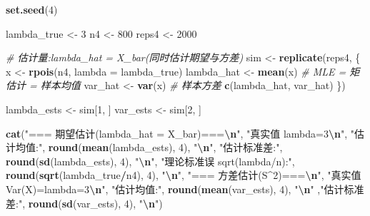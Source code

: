 \documentclass[
]{article}
\newenvironment{Shaded}{\begin{snugshade}}{\end{snugshade}}
\newcommand{\AttributeTok}[1]{\textcolor[rgb]{0.13,0.29,0.53}{#1}}
\newcommand{\CommentTok}[1]{\textcolor[rgb]{0.56,0.35,0.01}{\textit{#1}}}
\newcommand{\DecValTok}[1]{\textcolor[rgb]{0.00,0.00,0.81}{#1}}
\newcommand{\FunctionTok}[1]{\textcolor[rgb]{0.13,0.29,0.53}{\textbf{#1}}}
\newcommand{\NormalTok}[1]{#1}
\newcommand{\OtherTok}[1]{\textcolor[rgb]{0.56,0.35,0.01}{#1}}
\newcommand{\SpecialCharTok}[1]{\textcolor[rgb]{0.81,0.36,0.00}{\textbf{#1}}}
\newcommand{\StringTok}[1]{\textcolor[rgb]{0.31,0.60,0.02}{#1}}
\begin{document}
\begin{Shaded}
\begin{Highlighting}[]
\FunctionTok{set.seed}\NormalTok{(}\DecValTok{4}\NormalTok{)}

\NormalTok{lambda\_true }\OtherTok{\textless{}{-}} \DecValTok{3}
\NormalTok{n4          }\OtherTok{\textless{}{-}} \DecValTok{800}
\NormalTok{reps4       }\OtherTok{\textless{}{-}} \DecValTok{2000}

\CommentTok{\# 估计量:lambda\_hat = X\_bar(同时估计期望与方差)}
\NormalTok{sim }\OtherTok{\textless{}{-}} \FunctionTok{replicate}\NormalTok{(reps4, \{}
\NormalTok{  x      }\OtherTok{\textless{}{-}} \FunctionTok{rpois}\NormalTok{(n4, }\AttributeTok{lambda =}\NormalTok{ lambda\_true)}
\NormalTok{  lambda\_hat }\OtherTok{\textless{}{-}} \FunctionTok{mean}\NormalTok{(x)      }\CommentTok{\# MLE = 矩估计 = 样本均值}
\NormalTok{  var\_hat    }\OtherTok{\textless{}{-}} \FunctionTok{var}\NormalTok{(x)       }\CommentTok{\# 样本方差}
  \FunctionTok{c}\NormalTok{(lambda\_hat, var\_hat)}
\NormalTok{\})}

\NormalTok{lambda\_ests }\OtherTok{\textless{}{-}}\NormalTok{ sim[}\DecValTok{1}\NormalTok{, ]}
\NormalTok{var\_ests    }\OtherTok{\textless{}{-}}\NormalTok{ sim[}\DecValTok{2}\NormalTok{, ]}

\FunctionTok{cat}\NormalTok{(}\StringTok{"=== 期望估计(lambda\_hat = X\_bar)===}\SpecialCharTok{\textbackslash{}n}\StringTok{"}\NormalTok{,}
\StringTok{"真实值 lambda=3}\SpecialCharTok{\textbackslash{}n}\StringTok{"}\NormalTok{,}
\StringTok{"估计均值:"}\NormalTok{, }\FunctionTok{round}\NormalTok{(}\FunctionTok{mean}\NormalTok{(lambda\_ests), }\DecValTok{4}\NormalTok{), }\StringTok{"}\SpecialCharTok{\textbackslash{}n}\StringTok{"}\NormalTok{,}
\StringTok{"估计标准差:"}\NormalTok{, }\FunctionTok{round}\NormalTok{(}\FunctionTok{sd}\NormalTok{(lambda\_ests), }\DecValTok{4}\NormalTok{), }\StringTok{"}\SpecialCharTok{\textbackslash{}n}\StringTok{"}\NormalTok{,}
\StringTok{"理论标准误 sqrt(lambda/n):"}\NormalTok{, }\FunctionTok{round}\NormalTok{(}\FunctionTok{sqrt}\NormalTok{(lambda\_true}\SpecialCharTok{/}\NormalTok{n4), }\DecValTok{4}\NormalTok{), }\StringTok{"}\SpecialCharTok{\textbackslash{}n}\StringTok{"}\NormalTok{,}
\StringTok{"=== 方差估计(S\^{}2)===}\SpecialCharTok{\textbackslash{}n}\StringTok{"}\NormalTok{,}
\StringTok{"真实值 Var(X)=lambda=3}\SpecialCharTok{\textbackslash{}n}\StringTok{"}\NormalTok{,}
\StringTok{"估计均值:"}\NormalTok{, }\FunctionTok{round}\NormalTok{(}\FunctionTok{mean}\NormalTok{(var\_ests), }\DecValTok{4}\NormalTok{), }\StringTok{"}\SpecialCharTok{\textbackslash{}n}\StringTok{"}
\NormalTok{,}\StringTok{"估计标准差:"}\NormalTok{, }\FunctionTok{round}\NormalTok{(}\FunctionTok{sd}\NormalTok{(var\_ests), }\DecValTok{4}\NormalTok{), }\StringTok{"}\SpecialCharTok{\textbackslash{}n}\StringTok{"}\NormalTok{)}
\end{Highlighting}
\end{Shaded}
\end{document}
